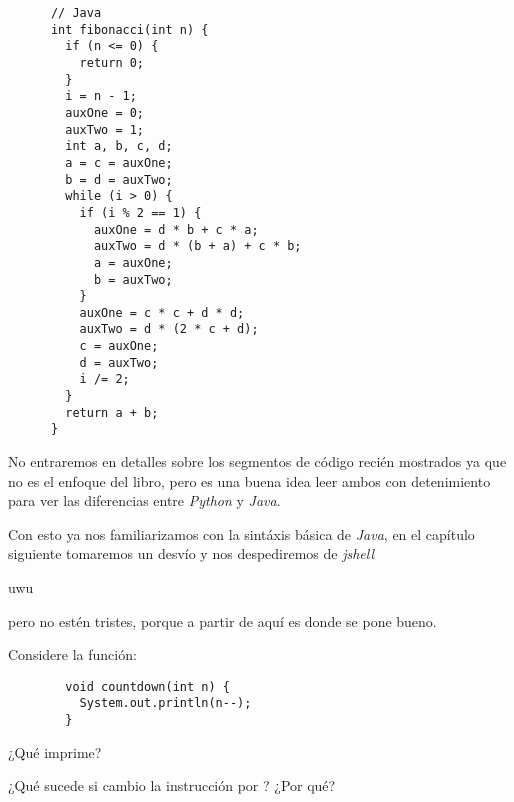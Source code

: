     \begin{verbatim}
      // Java
      int fibonacci(int n) {
        if (n <= 0) {
          return 0;
        }
        i = n - 1;
        auxOne = 0;
        auxTwo = 1;
        int a, b, c, d;
        a = c = auxOne;
        b = d = auxTwo;
        while (i > 0) {
          if (i % 2 == 1) {
            auxOne = d * b + c * a;
            auxTwo = d * (b + a) + c * b;
            a = auxOne;
            b = auxTwo;
          }
          auxOne = c * c + d * d;
          auxTwo = d * (2 * c + d);
          c = auxOne;
          d = auxTwo;
          i /= 2;
        }
        return a + b;
      }
    \end{verbatim}
    
    No entraremos en detalles sobre los segmentos de código recién mostrados ya que no es el enfoque
    del libro, pero es una buena idea leer ambos con detenimiento para ver las diferencias entre
    \textit{Python} y \textit{Java}.

    Con esto ya nos familiarizamos con la sintáxis básica de \textit{Java}, en el capítulo siguiente
    tomaremos un desvío y nos despediremos de \textit{jshell}
    \begin{center}
      uwu
    \end{center}
    pero no estén tristes, porque a partir de aquí es donde se pone bueno.

    \begin{exercise}
      Considere la función:
      \begin{verbatim}
        void countdown(int n) {
          System.out.println(n--);
        }
      \end{verbatim}
      ¿Qué imprime?

      ¿Qué sucede si cambio la instrucción  por ?
      ¿Por qué?
    \end{exercise}